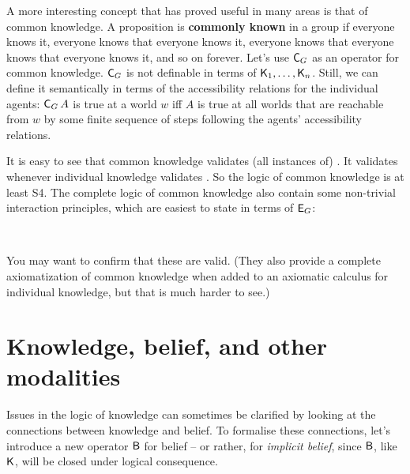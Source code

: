 A more interesting concept that has proved useful in many areas is that of
common knowledge. A proposition is \textbf{commonly known} in a group if
everyone knows it, everyone knows that everyone knows it, everyone knows that
everyone knows that everyone knows it, and so on forever. Let's use $\operatorname{\mathsf{C}}_{G}$
as an operator for common knowledge. $\operatorname{\mathsf{C}}_G$ is not definable in terms of
$\operatorname{\mathsf{K}{}}_1, \ldots,\operatorname{\mathsf{K}{}}_n$. Still, we can define it semantically in terms of the
accessibility relations for the individual agents: $\operatorname{\mathsf{C}}_{G} A$ is true at a
world $w$ iff $A$ is true at all worlds that are reachable from $w$ by some
finite sequence of steps following the agents' accessibility relations.


It is easy to see that common knowledge validates (all instances of) . It
validates  whenever individual knowledge validates . So the logic of
common knowledge is at least S4. The complete logic of common knowledge also
contain some non-trivial interaction principles, which are easiest to state in
terms of $\operatorname{\mathsf{E}}_G$:
%
\begin{principles}
  \\
\end{principles}
%
You may want to confirm that these are valid. (They also provide a complete
axiomatization of common knowledge when added to an axiomatic calculus for
individual knowledge, but that is much harder to see.)


\section{Knowledge, belief, and other modalities}
\label{sec:kb}

Issues in the logic of knowledge can sometimes be clarified by looking at the
connections between knowledge and belief. To formalise these connections, let's
introduce a new operator $\operatorname{\mathsf{B}}$ for belief -- or rather, for \emph{implicit
  belief}, since $\operatorname{\mathsf{B}}$, like $\operatorname{\mathsf{K}{}}$, will be closed under logical
consequence.

